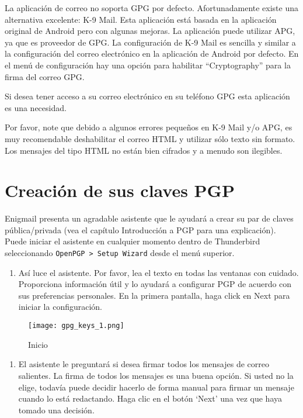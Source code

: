 \documentclass[10pt,a5paper,twoside,,]{book}
\providecommand{\tightlist}{%
  \setlength{\itemsep}{0pt}\setlength{\parskip}{0pt}}
\begin{document}
La aplicación de correo no soporta GPG por defecto. Afortunadamente
existe una alternativa excelente: K-9 Mail. Esta aplicación está basada
en la aplicación original de Android pero con algunas mejoras. La
aplicación puede utilizar APG, ya que es proveedor de GPG. La
configuración de K-9 Mail es sencilla y similar a la configuración del
correo electrónico en la aplicación de Android por defecto. En el menú
de configuración hay una opción para habilitar ``Cryptography'' para la
firma del correo GPG.

Si desea tener acceso a su correo electrónico en su teléfono GPG esta
aplicación es una necesidad.

Por favor, note que debido a algunos errores pequeños en K-9 Mail y/o
APG, es muy recomendable deshabilitar el correo HTML y utilizar sólo
texto sin formato. Los mensajes del tipo HTML no están bien cifrados y a
menudo son ilegibles.

\chapter{Creación de sus claves
PGP}\label{creaciuxf3n-de-sus-claves-pgp}

Enigmail presenta un agradable asistente que le ayudará a crear su par
de claves pública/privada (vea el capítulo Introducción a PGP para una
explicación). Puede iniciar el asistente en cualquier momento dentro de
Thunderbird seleccionando
\texttt{OpenPGP\ \textgreater{}\ Setup\ Wizard} desde el menú superior.

\begin{enumerate}
\def\labelenumi{\arabic{enumi}.}
\tightlist
\item
  Así luce el asistente. Por favor, lea el texto en todas las ventanas
  con cuidado. Proporciona información útil y lo ayudará a configurar
  PGP de acuerdo con sus preferencias personales. En la primera
  pantalla, haga click en Next para iniciar la configuración.
\end{enumerate}

\begin{figure}[htbp]
\centering
\texttt{[image: gpg\_keys\_1.png]}
\caption{Inicio}
\end{figure}

\begin{enumerate}
\def\labelenumi{\arabic{enumi}.}
\setcounter{enumi}{1}
\tightlist
\item
  El asistente le preguntará si desea firmar todos los mensajes de
  correo salientes. La firma de todos los mensajes es una buena opción.
  Si usted no la elige, todavía puede decidir hacerlo de forma manual
  para firmar un mensaje cuando lo está redactando. Haga clic en el
  botón `Next' una vez que haya tomado una decisión.
\end{enumerate}
\end{document}
